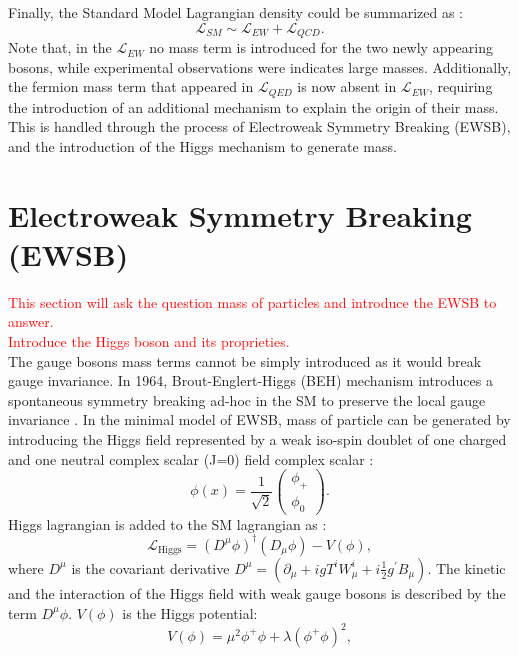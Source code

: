 Finally, the Standard Model Lagrangian density could be summarized as : 
\begin{equation}
    \mathcal{L}_{SM} \sim \mathcal{L}_{EW} + \mathcal{L}_{QCD}.
\end{equation}
Note that, in the $\mathcal{L}_{EW}$ no mass term is introduced for the two newly appearing bosons, while experimental observations were indicates large masses. Additionally, the fermion mass term that appeared in $\mathcal{L}_{QED}$ is now absent in $\mathcal{L}_{EW}$, requiring the introduction of an additional mechanism to explain the origin of their mass. This is handled through the process of Electroweak Symmetry Breaking (EWSB), and the introduction of the Higgs mechanism to generate mass.

\section{Electroweak Symmetry Breaking (EWSB)}
\label{chap1:EWSB}
\textcolor{red}{This section will ask the question mass of particles and introduce the EWSB to answer.\\
Introduce the Higgs boson and its proprieties.\\
}
The gauge bosons mass terms cannot be simply introduced as it would break gauge invariance. In 1964, Brout-Englert-Higgs (BEH) mechanism introduces a spontaneous symmetry breaking ad-hoc in the SM to preserve the local gauge invariance \cite{Englert}. In the minimal model of EWSB, mass of particle can be generated by introducing the Higgs field represented by a weak iso-spin doublet of one charged and one neutral complex scalar (J=0) field complex scalar :
\begin{equation}
    \phi(x)=\frac{1}{\sqrt{2}}\left(\begin{array}{c}
\phi_{+} \\
\phi_{0}
\end{array}\right).
\end{equation}
Higgs lagrangian is added to the SM lagrangian as :
\begin{equation}
    \mathcal{L}_{\mathrm{Higgs}}=\left(D^{\mu} \phi\right)^{\dagger}\left(D_{\mu} \phi\right)-V(\phi),
\end{equation}
where $D^\mu$ is the covariant derivative $D^\mu =\left(\partial_{\mu}+i g T^{i} W_{\mu}^{i}+i \frac{1}{2} g^{\prime} B_{\mu}\right)$. The kinetic and the interaction of the Higgs field with weak gauge bosons is described by the term $D^\mu\phi$. $V(\phi)$ is the Higgs potential:
\begin{equation}
    V(\phi)=\mu^{2} \phi^{+} \phi+\lambda\left(\phi^{+} \phi\right)^{2},
\end{equation}
